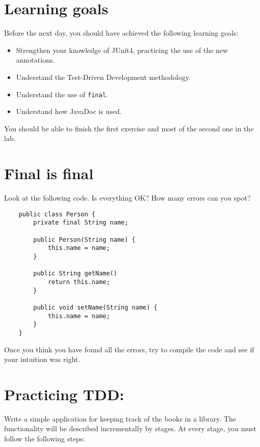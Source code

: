 \documentclass{article}
\begin{document}
\section*{Learning goals}
\label{sec:learning-goals}

Before the next day, you should have achieved the following learning
goals: 

\begin{itemize}
\item Strengthen your knowledge of JUnit4, practicing the use of the
  new annotations.
\item Understand the Test-Driven Development methodology. 
\item Understand the use of \verb+final+.
\item Understand how JavaDoc is used.
\end{itemize}

You should be able to finish the first exercise and most of the second
one in the lab.

\section{Final is final}
\label{sec:final-final}

Look at the following code. Is everything OK? How many errors can you spot?

\begin{verbatim}
    public class Person {
        private final String name;

        public Person(String name) {
            this.name = name;
        }

        public String getName()
            return this.name;
        }

        public void setName(String name) {
            this.name = name;
        }
    }
\end{verbatim}

Once you think you have found all the errors, try to compile the code
and see if your intuition was right. 

\section{Practicing TDD: }
\label{sec:jj}

Write a simple application for keeping track of the books in a
library. The functionality will be described incrementally by
stages. At every stage, you must follow the following steps:
\end{document}
